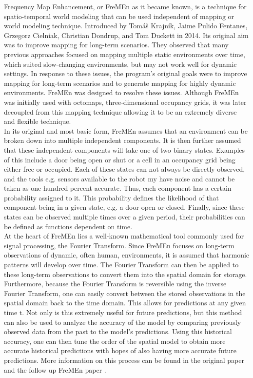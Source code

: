   Frequency Map Enhancement, or FreMEn as it became known, is a technique for
  spatio-temporal world modeling that can be used independent of mapping or
  world modeling technique. Introduced by Tomáš Krajník, Jaime Pulido
  Fentanes, Grzegorz Cielniak, Christian Dondrup, and Tom Duckett in 2014. Its
  original aim was to improve mapping for long-term scenarios.
  They observed that many previous approaches focused on mapping multiple
  static environments over time, which suited slow-changing environments, but
  may not work well for dynamic settings. In response to these issues, the
  program's original goals were to improve mapping for long-term scenarios and
  to generate mapping for highly dynamic environments. FreMEn was designed to
  resolve these issues. \cite{Fentanes2014} Although FreMEn was initially used with
  octomaps, three-dimensional occupancy grids, it was later decoupled from
  this mapping technique allowing it to be an extremely diverse and flexible
  technique. \\

  In its original and most basic form, FreMEn assumes that an environment can be
  broken down into multiple independent components. It is then further assumed
  that these independent components will take one of two binary states. Examples
  of this include a door being open or shut or a cell in
  an occupancy grid being either free or occupied. Each of these states can not
  always be directly observed, and the tools e.g. sensors available to the robot
  my have noise and cannot be taken as one hundred percent accurate. Thus,
  each component has a certain probability assigned to it. This
  probability defines the likelihood of that component being in a given state, e.g. a door
  open or closed. Finally, since these states can be observed multiple times
  over a given period, their probabilities can be defined as
  functions dependent on time. \\

  At the heart of FreMEn lies a well-known mathematical tool commonly used for
  signal processing, the Fourier Transform. Since FreMEn focuses on long-term
  observations of dynamic, often human, environments, it is assumed that harmonic
  patterns will develop over time. The Fourier Transform can then be applied to
  these long-term observations to convert them into the spatial domain for
  storage. Furthermore, because the Fourier Transform is reversible
  using the inverse Fourier Transform, one can easily convert between the stored
  observations in the spatial domain back to the time domain. This allows for
  predictions at any given time t. Not only is this extremely useful for future
  predictions, but this method can also be used to analyze the accuracy of the
  model by comparing previously observed data from the past to the model's
  predictions. Using this historical accuracy, one can then tune the order of the
  spatial model to obtain more accurate historical predictions with hopes of
  also having more accurate future predictions. More information on this process
  can be found in the original paper\cite{Fentanes2014} and the follow up FreMEn
  paper \cite{Krajnik2015}. \\

